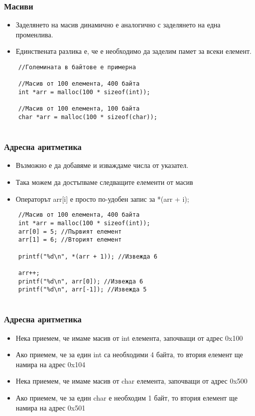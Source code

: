 \documentclass[ignorenonframetext, hyperref=unicode]{beamer}
\begin{document}
\begin{frame}[containsverbatim]
\frametitle{Масиви}
\begin{itemize}
	\item Заделянето на масив динамично е аналогично с заделянето на една променлива.
	\item Единствената разлика е, че е необходимо да заделим памет за всеки елемент.
\end{itemize}
\begin{lstlisting}
	//Големината в байтове е примерна
	
	//Масив от 100 елемента, 400 байта
	int *arr = malloc(100 * sizeof(int));
	
	//Масив от 100 елемента, 100 байта
	char *arr = malloc(100 * sizeof(char)); 
	
\end{lstlisting}
\end{frame}

\begin{frame}[containsverbatim]
\frametitle{Адресна аритметика}
\begin{itemize}
	\item Възможно е да добавяме и изваждаме числа от указател.
	\item Така можем да достъпваме следващите елементи от масив
	\item Операторът arr[i] е просто по-удобен запис за *(arr + i);
\end{itemize}
\begin{lstlisting}
	//Масив от 100 елемента, 400 байта
	int *arr = malloc(100 * sizeof(int));
	arr[0] = 5; //Първият елемент
	arr[1] = 6; //Вторият елемент
	
	printf("%d\n", *(arr + 1)); //Извежда 6
	
	arr++;
	printf("%d\n", arr[0]); //Извежда 6
	printf("%d\n", arr[-1]); //Извежда 5
	
\end{lstlisting}
\end{frame}

\begin{frame}[containsverbatim]
\frametitle{Адресна аритметика}
\begin{itemize}
	\item Нека приемем, че имаме масив от int елемента, започващи от адрес 0x100
	\item Ако приемем, че за един int са необходими 4 байта, то втория елемент ще намира на адрес 0x104
	\item Нека приемем, че имаме масив от char елемента, започващи от адрес 0x500
	\item Ако приемем, че за един char е необходим 1 байт, то втория елемент ще намира на адрес 0x501
\end{itemize}
\end{frame}
\end{document}
